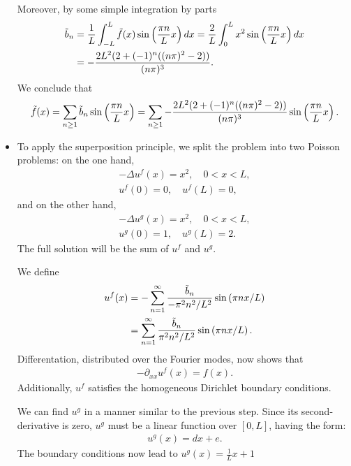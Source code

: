 \documentclass[11pt]{article}
\begin{document}
\begin{solution}
\begin{itemize}
        Moreover, by some simple integration by parts 
        \begin{align*}
            \Tilde{b}_n &= \frac{1}{L} \int_{-L}^L \Tilde{f}(x) \sin\left(\frac{\pi n}{L} x\right) dx = \frac{2}{L} \int_{0}^L x^2 \sin\left(\frac{\pi n}{L} x\right) dx\\
            &= -\frac{2 L^2 (2 + (-1)^n ((n \pi)^2 - 2))}{(n\pi)^3}.
        \end{align*}
        We conclude that
        \begin{align*}
            \Tilde{f}(x) = \sum_{n \geq 1} \Tilde{b}_n \sin\left(\frac{\pi n}{L} x\right) = \sum_{n \geq 1} -\frac{2 L^2 (2 + (-1)^n ((n \pi)^2 - 2))}{(n\pi)^3} \sin\left(\frac{\pi n}{L} x\right).
        \end{align*}
        \item 
        To apply the superposition principle, 
        we split the problem into two Poisson problems: on the one hand,
        \begin{gather*}
            - \Delta u^f(x) = x^2, \quad 0 < x < L,
            \\
            u^f(0) = 0, \quad u^f(L) = 0, 
        \end{gather*}
        and on the other hand, 
        \begin{gather*}
            - \Delta u^g(x) = x^2, \quad 0 < x < L,
            \\
            u^g(0) = 1, \quad u^g(L) = 2.
        \end{gather*}
        The full solution will be the sum of $u^{f}$ and $u^{g}$.
        
        We define 
        \begin{align}
            u^{f}(x) 
            &
            = 
            - \sum_{n=1}^{\infty} \frac{\Tilde{b}_n}{ -\pi^{2} n^{2} / L^{2} } \sin\left( \pi n x / L \right)
            \\&
            = 
            \sum_{n=1}^{\infty} \frac{\Tilde{b}_n}{ \pi^{2} n^{2} / L^{2} } \sin\left( \pi n x / L \right)
            .
        \end{align}
        Differentation, distributed over the Fourier modes, now shows that 
        \begin{align}
            - \partial_{xx} u^{f}(x) = f(x).
        \end{align}
        Additionally, $u^{f}$ satisfies the homogeneous Dirichlet boundary conditions. 
        
        We can find $u^{g}$ in a manner similar to the previous step. 
        Since its second-derivative is zero, $u^{g}$ must be a linear function over $[0,L]$, having the form:
        \begin{align}
            u^{g}(x) = d x + e.
        \end{align}
        The boundary conditions now lead to $u^{g}(x) = \frac{1}{L} x + 1$
        

\end{itemize}
\end{solution}
\end{document}
